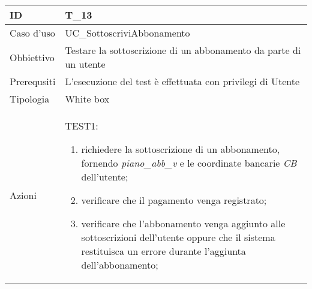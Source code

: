 \begin{table}[hb]
    \centering
    \begin{tabular}{ |p{2cm}|p{10cm}|  }
        \hline
        ID          & T\_13                                                             \\\hline
        Caso d'uso  & UC\_SottoscriviAbbonamento                                        \\\hline
        Obbiettivo  & Testare la sottoscrizione di un abbonamento da parte di un utente \\\hline
        Prerequsiti & L'esecuzione del test è effettuata con privilegi di Utente        \\\hline
        Tipologia   & White box                                                         \\\hline
        Azioni      &
        TEST1:
        \begin{enumerate}[nosep, topsep=0pt]
            \item richiedere la sottoscrizione di un abbonamento, fornendo \emph{piano\_abb\_v} e le coordinate bancarie \emph{CB} dell'utente;
            \item verificare che il pagamento venga registrato;
            \item verificare che l'abbonamento venga aggiunto alle sottoscrizioni dell'utente oppure che il sistema restituisca un errore durante l'aggiunta dell'abbonamento;
        \end{enumerate}
        \\\hline
    \end{tabular}
\end{table}

